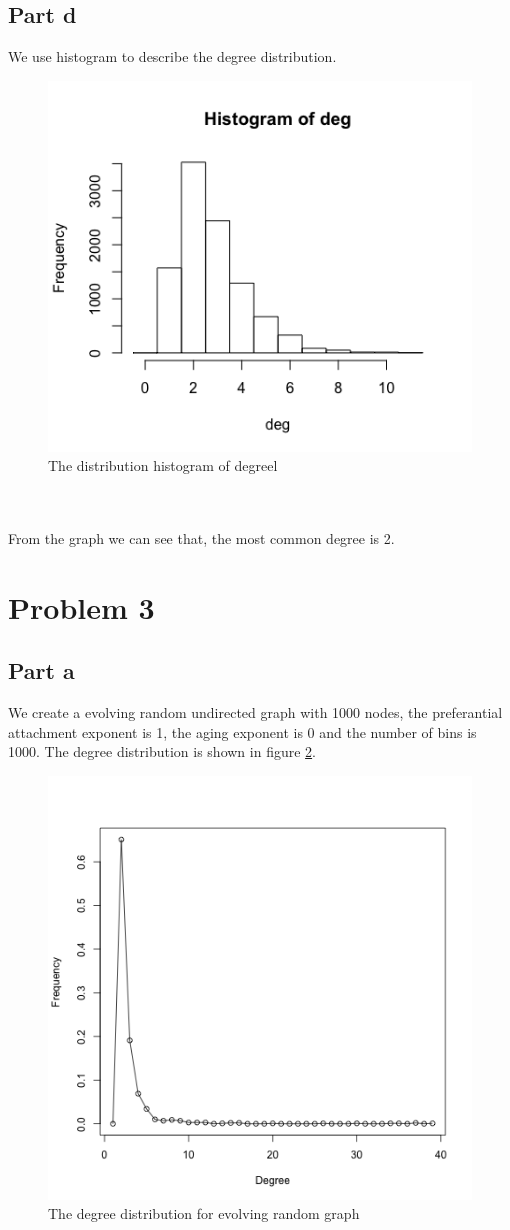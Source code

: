 \documentclass{article}
\begin{document}
\subsection{Part d}
We use histogram to describe the degree distribution.\\
\begin{figure}[htbp]
\centering
\includegraphics[width=.6\textwidth]{p2_2.png}
\caption{The distribution histogram of degreel}
\label{fig:sp_hist}
\end{figure}
\\
\\
From the graph we can see that, the most common degree is 2.
\section{Problem 3}
\subsection{Part a}
We create a evolving random undirected graph with 1000 nodes, the preferantial attachment exponent is 1, the aging exponent is 0 and the number of bins is 1000. The degree distribution is shown in figure \ref{fig:p3_1}.
\begin{figure}[htbp]
\centering
\includegraphics[width=.6\textwidth]{p3_1.png}
\caption{The degree distribution for evolving random graph}
\label{fig:p3_1}
\end{figure}
\end{document}
